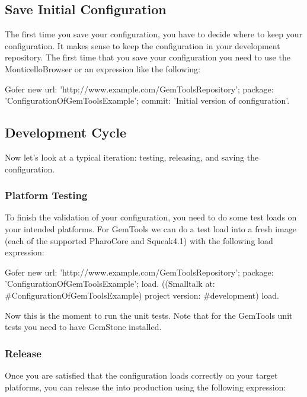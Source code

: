 \documentclass[a4paper,10pt,twoside]{book}
\begin{document}
\begin{code}{}
\begin{code}{}
\subsection{Save Initial Configuration}

The first time you save your configuration, you have to decide where to keep your configuration. It makes sense to keep the configuration in your development repository. The first time that you save your configuration you need to use the MonticelloBrowser or an expression like the following:

\begin{code}{}
  Gofer new
     url: 'http://www.example.com/GemToolsRepository';
     package: 'ConfigurationOfGemToolsExample';
     commit: 'Initial version of configuration'.
\end{code}     


\subsection{Development Cycle}
Now let's look at a typical iteration: testing, releasing, and saving the configuration.
 
\subsubsection{Platform Testing}
To finish the validation of your configuration, you need to do some test loads on your intended platforms. For GemTools we can do a test load into a fresh image (each of the supported PharoCore and Squeak4.1) with the following load expression:

\begin{code}{}
Gofer new
  url: 'http://www.example.com/GemToolsRepository';
  package: 'ConfigurationOfGemToolsExample';
  load.
((Smalltalk at: #ConfigurationOfGemToolsExample)
     project version: #development) load.
\end{code}     
     
Now this is the moment to run the unit tests. Note that for the GemTools unit tests you need to have GemStone installed.

\subsubsection{Release}
Once you are satisfied that the configuration loads correctly on your target platforms, you can release the  into production using the following expression:


\end{code}
\end{code}
\end{document}
